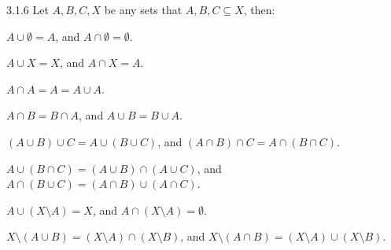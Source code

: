 \begin{exercise}{3.1.6}
	Let $A,B,C,X$ be any sets that $A,B,C \subseteq X$, then:
	\begin{enumabc}
		\item $A \cup \emptyset = A$, and $A \cap \emptyset = \emptyset$.
		\item $A \cup X = X$, and $A \cap X = A$.
		\item $A \cap A = A = A \cup A$.
		\item $A \cap B = B \cap A$, and $A \cup B = B \cup A$.
		\item $(A \cup B) \cup C = A \cup (B \cup C)$, and $(A \cap B) \cap C = A \cap (B \cap C)$.
		\item $A \cup (B \cap C) = (A \cup B) \cap (A \cup C)$, and $A \cap (B \cup C) = (A \cap B) \cup (A \cap C)$.
		\item $A \cup (X \setminus A) = X$, and $A \cap (X \setminus A) = \emptyset$. 
		\item $X \setminus (A \cup B) = (X \setminus A) \cap (X \setminus B)$, and $X \setminus (A \cap B) = (X \setminus A) \cup (X \setminus B)$.
	\end{enumabc}
\end{exercise}
